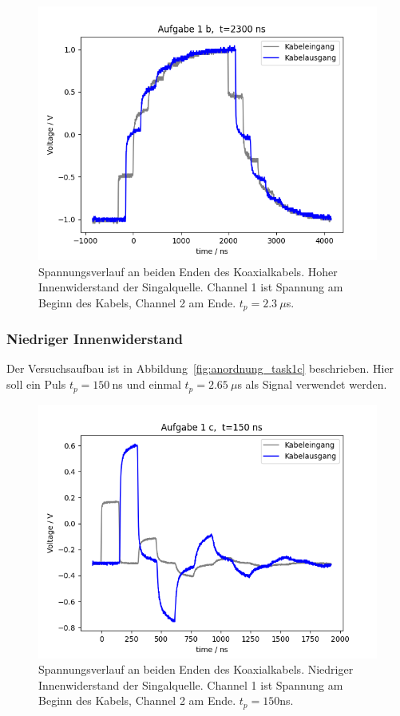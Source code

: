 \documentclass{article}
\begin{document}
\begin{figure}[H]
\centering
\caption{Spannungsverlauf an beiden Enden des Koaxialkabels. Hoher Innenwiderstand der Singalquelle. Channel 1 ist Spannung am Beginn des Kabels, Channel 2 am Ende. $t_p = 2.3~\mu$s.}
\label{fig:task1b_2300ns}
\includegraphics[scale=0.6]{bilder/task1b/task1b_2300ns.png}
\end{figure}



\subsubsection{Niedriger Innenwiderstand}
Der Versuchsaufbau ist in Abbildung~\ref{fig:anordnung_task1c} beschrieben. Hier soll ein Puls $t_p = 150~$ns und einmal $t_p = 2.65~\mu$s  als Signal verwendet werden.

\begin{figure}[H]
\centering
\caption{Spannungsverlauf an beiden Enden des Koaxialkabels. Niedriger Innenwiderstand der Singalquelle. Channel 1 ist Spannung am Beginn des Kabels, Channel 2 am Ende. $t_p = 150$ns.}
\label{fig:task1c_150ns}
\includegraphics[scale=0.6]{bilder/task1c/task1c_150ns.png}
\end{figure}
\end{document}
